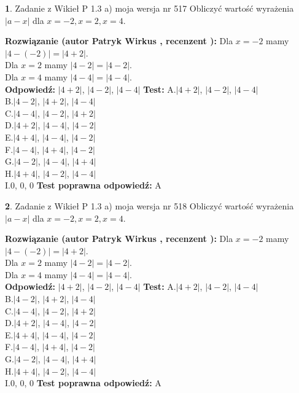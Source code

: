 \documentclass[12pt, a4paper]{article}
\theoremstyle{definition} %
\newtheorem{zad}{}
\newcommand{\zadStart}[1]{\begin{zad}#1\newline}
\newcommand{\zadStop}{\end{zad}}
\newcommand{\rozwStart}[2]{\noindent \textbf{Rozwiązanie (autor #1 , recenzent #2): }\newline}
\newcommand{\rozwStop}{\newline}
\newcommand{\odpStart}{\noindent \textbf{Odpowiedź:}\newline}
\newcommand{\odpStop}{\newline}
\newcommand{\testStart}{\noindent \textbf{Test:}\newline}
\newcommand{\testStop}{\newline}
\newcommand{\kluczStart}{\noindent \textbf{Test poprawna odpowiedź:}\newline}
\newcommand{\kluczStop}{\newline}
\begin{document}
\zadStart{Zadanie z Wikieł P 1.3 a) moja wersja nr 517}
Obliczyć wartość wyrażenia $|a - x|$ dla $x=-2,x=2,x=4$.
\zadStop
\rozwStart{Patryk Wirkus}{}
Dla $x = -2$ mamy $|4 - (-2)| = |4 + 2|$.\\
Dla $x = 2$ mamy $|4 - 2| = |4 - 2|$.\\
Dla $x = 4$ mamy $|4 - 4| = |4 - 4|$.\\
\rozwStop
\odpStart
$|4 + 2|$, $|4 - 2|$, $|4 - 4|$
\odpStop
\testStart
A.$|4 + 2|$, $|4 - 2|$, $|4 - 4|$\\
B.$|4 - 2|$, $|4 + 2|$, $|4 - 4|$\\
C.$|4 - 4|$, $|4 - 2|$, $|4 + 2|$\\
D.$|4 + 2|$, $|4 - 4|$, $|4 - 2|$\\
E.$|4 + 4|$, $|4 - 4|$, $|4 - 2|$\\
F.$|4 - 4|$, $|4 + 4|$, $|4 - 2|$\\
G.$|4 - 2|$, $|4 - 4|$, $|4 + 4|$\\
H.$|4 + 4|$, $|4 - 2|$, $|4 - 4|$\\
I.$0$, $0$, $0$
\testStop
\kluczStart
A
\kluczStop



\zadStart{Zadanie z Wikieł P 1.3 a) moja wersja nr 518}
Obliczyć wartość wyrażenia $|a - x|$ dla $x=-2,x=2,x=4$.
\zadStop
\rozwStart{Patryk Wirkus}{}
Dla $x = -2$ mamy $|4 - (-2)| = |4 + 2|$.\\
Dla $x = 2$ mamy $|4 - 2| = |4 - 2|$.\\
Dla $x = 4$ mamy $|4 - 4| = |4 - 4|$.\\
\rozwStop
\odpStart
$|4 + 2|$, $|4 - 2|$, $|4 - 4|$
\odpStop
\testStart
A.$|4 + 2|$, $|4 - 2|$, $|4 - 4|$\\
B.$|4 - 2|$, $|4 + 2|$, $|4 - 4|$\\
C.$|4 - 4|$, $|4 - 2|$, $|4 + 2|$\\
D.$|4 + 2|$, $|4 - 4|$, $|4 - 2|$\\
E.$|4 + 4|$, $|4 - 4|$, $|4 - 2|$\\
F.$|4 - 4|$, $|4 + 4|$, $|4 - 2|$\\
G.$|4 - 2|$, $|4 - 4|$, $|4 + 4|$\\
H.$|4 + 4|$, $|4 - 2|$, $|4 - 4|$\\
I.$0$, $0$, $0$
\testStop
\kluczStart
A
\kluczStop
\end{document}
